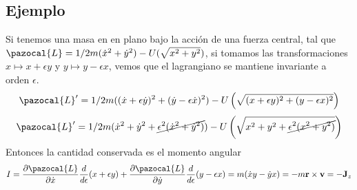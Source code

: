 
\subsection{Ejemplo} 
Si tenemos una masa en en plano bajo la acción de una fuerza central, tal que $\pazocal{L}=1/2m(\dot{x}^2+\dot{y}^2)-U(\sqrt{x^2+y^2})$, si tomamos las transformaciones $x \mapsto x +\epsilon y$ y $y \mapsto y - \epsilon x$, vemos que el lagrangiano se mantiene invariante a orden $\epsilon$.
\[\pazocal{L}'=1/2m((\dot{x} +\epsilon \dot{y})^2+(\dot{y} -\epsilon \dot{x})^2)-U\left(\sqrt{(x +\epsilon y)^2+(y - \epsilon x)^2}\right)\]
\[\pazocal{L}'=1/2m(\dot{x}^2+\dot{y}^2+\cancel{\epsilon^2(\dot{x}^2+\dot{y}^2)}) - U\left(\sqrt{x^2 +y^2 +\cancel{\epsilon^2(x^2+y^2)}}\right)\]
Entonces la cantidad conservada es el momento angular
\[I=\frac{\partial \pazocal{L}}{\partial \dot{x}}\frac{d}{d\epsilon}(x+\epsilon y)+\frac{\partial \pazocal{L}}{\partial \dot{y}}\frac{d}{d\epsilon}(y-\epsilon x)=m(\dot{x}y-\dot{y}x)=-m \mathbf{r} \times \mathbf{v}= -\mathbf{J}_z\]
